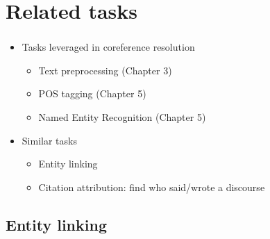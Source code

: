 \documentclass[xcolor=table]{beamer}
\begin{document}
\section{Related tasks}

\begin{frame}
	\frametitle{\insertshortsubtitle}
	\framesubtitle{\insertsection}
	
	\begin{itemize}
		\item Tasks leveraged in coreference resolution
		\begin{itemize}
			\item Text preprocessing (Chapter 3)
			\item POS tagging (Chapter 5)
			\item Named Entity Recognition (Chapter 5)
		\end{itemize}
		
		\item Similar tasks
		\begin{itemize}
			\item Entity linking
			\item Citation attribution: find who said/wrote a discourse
		\end{itemize}
	\end{itemize}
	
\end{frame}

\subsection{Entity linking}
\end{document}
